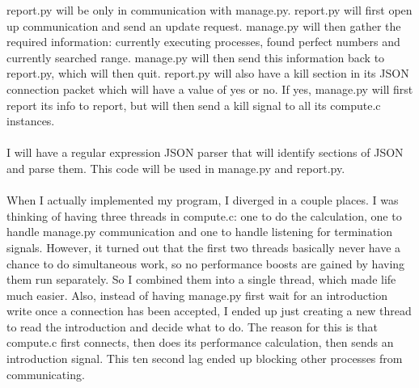 \documentclass[11pt]{article}
\begin{document}
report.py will be only in communication with manage.py. report.py will first open up communication and send an update request. manage.py will then gather the required information: currently executing processes, found perfect numbers and currently searched range. manage.py will then send this information back to report.py, which will then quit. report.py will also have a kill section in its JSON connection packet which will have a value of yes or no. If yes, manage.py will first report its info to report, but will then send a kill signal to all its compute.c instances.\\ \\
I will have a regular expression JSON parser that will identify sections of JSON and parse them. This code will be used in manage.py and report.py.\\ \\
When I actually implemented my program, I diverged in a couple places. I was thinking of having three threads in compute.c: one to do the calculation, one to handle manage.py communication and one to handle listening for termination signals. However, it turned out that the first two threads basically never have a chance to do simultaneous work, so no performance boosts are gained by having them run separately. So I combined them into a single thread, which made life much easier. Also, instead of having manage.py first wait for an introduction write once a connection has been accepted, I ended up just creating a new thread to read the introduction and decide what to do. The reason for this is that compute.c first connects, then does its performance calculation, then sends an introduction signal. This ten second lag ended up blocking other processes from communicating.\\
\end{document}
